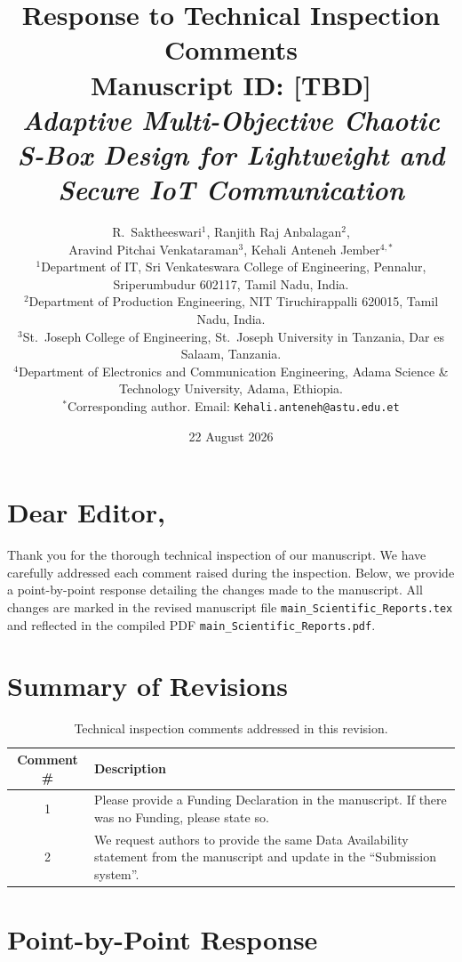 \documentclass[11pt,a4paper]{article}
\title{\normalsize Response to Technical Inspection Comments\\
\large Manuscript ID: [TBD]\\
\textit{Adaptive Multi-Objective Chaotic S-Box Design for Lightweight and Secure IoT Communication}}
\author{
R.~Saktheeswari$^{1}$, Ranjith Raj Anbalagan$^{2}$,\\
Aravind Pitchai Venkataraman$^{3}$, Kehali Anteneh Jember$^{4,\ast}$\\[0.4em]
\small $^{1}$Department of IT, Sri Venkateswara College of Engineering, Pennalur, Sriperumbudur 602117, Tamil Nadu, India.\\
\small $^{2}$Department of Production Engineering, NIT Tiruchirappalli 620015, Tamil Nadu, India.\\
\small $^{3}$St.\ Joseph College of Engineering, St.\ Joseph University in Tanzania, Dar es Salaam, Tanzania.\\
\small $^{4}$Department of Electronics and Communication Engineering, Adama Science \& Technology University, Adama, Ethiopia.\\
\small $^\ast$Corresponding author. Email: \texttt{Kehali.anteneh@astu.edu.et}
}
\date{22 August 2026}
\begin{document}
\maketitle

\section*{Dear Editor,}

Thank you for the thorough technical inspection of our manuscript. We have carefully addressed each comment raised during the inspection. Below, we provide a point-by-point response detailing the changes made to the manuscript. All changes are marked in the revised manuscript file \texttt{main\_Scientific\_Reports.tex} and reflected in the compiled PDF \texttt{main\_Scientific\_Reports.pdf}.

\section*{Summary of Revisions}

\begin{table}[h]
\centering
\renewcommand{\arraystretch}{1.3}
\begin{tabular}{|c|p{10cm}|}
\hline
\textbf{Comment \#} & \textbf{Description} \\
\hline
1 & Please provide a Funding Declaration in the manuscript. If there was no Funding, please state so. \\
\hline
2 & We request authors to provide the same Data Availability statement from the manuscript and update in the ``Submission system''. \\
\hline
\end{tabular}
\caption{Technical inspection comments addressed in this revision.}
\end{table}

\section*{Point-by-Point Response}
\end{document}
